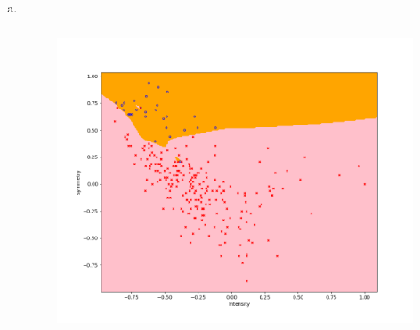 \documentclass[11pt]{article}
\begin{document}
\begin{enumerate} [(a)]
\begin{figure}[htb]
	\end{figure}
	\newpage
	\item \ \begin{figure}[htb] 
			{\includegraphics[height=9cm]{p2c.png}}
	\end{figure}
\end{enumerate}
\newpage
{}
\end{document}
